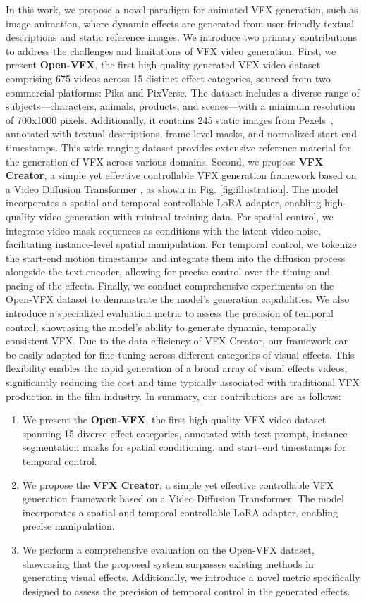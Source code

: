 In this work, we propose a novel paradigm for animated VFX generation, such as image animation, where dynamic effects are generated from user-friendly textual descriptions and static reference images. We introduce two primary contributions to address the challenges and limitations of VFX video generation.
First, we present \textbf{Open-VFX}, the first high-quality generated VFX video dataset comprising 675 videos across 15 distinct effect categories, sourced from two commercial platforms: Pika and PixVerse. The dataset includes a diverse range of subjects—characters, animals, products, and scenes—with a minimum resolution of 700x1000 pixels. Additionally, it contains 245 static images from Pexels~\cite{pexels2024}, annotated with textual descriptions, frame-level masks, and normalized start-end timestamps. This wide-ranging dataset provides extensive reference material for the generation of VFX across various domains.
Second, we propose \textbf{VFX Creator}, a simple yet effective controllable VFX generation framework based on a Video Diffusion Transformer \cite{yang2024cogvideox}, as shown in Fig. \ref{fig:illustration}. The model incorporates a spatial and temporal controllable LoRA adapter, enabling high-quality video generation with minimal training data.
For spatial control, we integrate video mask sequences as conditions with the latent video noise, facilitating instance-level spatial manipulation. For temporal control, we tokenize the start-end motion timestamps and integrate them into the diffusion process alongside the text encoder, allowing for precise control over the timing and pacing of the effects.
Finally, we conduct comprehensive experiments on the Open-VFX dataset to demonstrate the model's generation capabilities. We also introduce a specialized evaluation metric to assess the precision of temporal control, showcasing the model's ability to generate dynamic, temporally consistent VFX.
Due to the data efficiency of VFX Creator, our framework can be easily adapted for fine-tuning across different categories of visual effects. This flexibility enables the rapid generation of a broad array of visual effects videos, significantly reducing the cost and time typically associated with traditional VFX production in the film industry.
In summary, our contributions are as follows:
\begin{enumerate}
\item We present the \textbf{Open-VFX}, the first high-quality VFX video dataset spanning 15 diverse effect categories, annotated with text prompt, instance segmentation masks for spatial conditioning, and start–end timestamps for temporal control.
\item We propose the \textbf{VFX Creator}, a simple yet effective controllable VFX generation framework based on
a Video Diffusion Transformer. The model incorporates a spatial and temporal controllable LoRA adapter, enabling precise manipulation.
\item We perform a comprehensive evaluation on the Open-VFX dataset, showcasing that the proposed system surpasses existing methods in generating visual effects. Additionally, we introduce a novel metric specifically designed to assess the precision of temporal control in the generated effects.
\end{enumerate}
